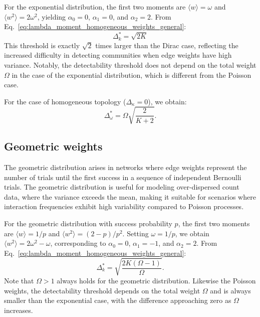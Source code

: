 \documentclass[a4paper,pre,superscriptaddress,floatfix,nofootinbib,twocolumn]{revtex4-1}
\begin{document}
For the exponential distribution, the first two moments are $\langle w \rangle = \omega$ and $\langle w^2 \rangle = 2\omega^2$, yielding $\alpha_0 = 0$, $\alpha_1 = 0$, and $\alpha_2 = 2$. From Eq.~\eqref{eq:lambda_moment_homogeneous_weights_general}:
\begin{equation}
\Delta_k^* = \sqrt{2K}
\label{eq:expon_det}
\end{equation}
This threshold is exactly $\sqrt{2}$ times larger than the Dirac case, reflecting the increased difficulty in detecting communities when edge weights have high variance.
Notably, the detectability threshold does not depend on the total weight $\Omega$ in the case of the exponential distribution, which is different from the Poisson case.

For the case of homogeneous topology ($\Delta_{\kappa} = 0$), we obtain:
\begin{equation}
\Delta_\omega^* = \Omega\sqrt{\frac{2}{K+2}}.
\label{eq:expon_w_det}
\end{equation}

\subsection*{Geometric weights}

The geometric distribution arises in networks where edge weights represent the number of trials until the first success in a sequence of independent Bernoulli trials. The geometric distribution is useful for modeling over-dispersed count data, where the variance exceeds the mean, making it suitable for scenarios where interaction frequencies exhibit high variability compared to Poisson processes.

For the geometric distribution with success probability $p$, the first two moments are $\langle w \rangle = 1/p$ and $\langle w^2 \rangle = (2-p)/p^2$. Setting $\omega = 1/p$, we obtain $\langle w^2 \rangle = 2\omega^2 - \omega$, corresponding to $\alpha_0 = 0$, $\alpha_1 = -1$, and $\alpha_2 = 2$. From Eq.~\eqref{eq:lambda_moment_homogeneous_weights_general}:
\begin{equation}
\Delta_k^* = \sqrt{\frac{2K(\Omega - 1)}{\Omega}}.
\label{eq:geometric_det}
\end{equation}
Note that $\Omega >1$ always holds for the geometric distribution.
Likewise the Poisson weights, the detectability threshold depends on the total weight $\Omega$ and is always smaller than the exponential case, with the difference approaching zero as $\Omega$ increases.
\end{document}
